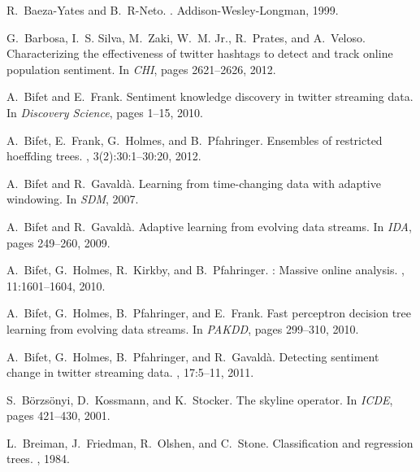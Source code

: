 \documentclass[twoside,leqno,twocolumn]{article}
\begin{document}






\begin{thebibliography}{10}
R.~Baeza-Yates and B.~R-Neto.
.
\newblock Addison-Wesley-Longman, 1999.

G.~Barbosa, I.~S. Silva, M.~Zaki, W.~M. {Jr.}, R.~Prates, and A.~Veloso.
\newblock Characterizing the effectiveness of twitter hashtags to detect and
  track online population sentiment.
\newblock In {\em CHI}, pages 2621--2626, 2012.

A.~Bifet and E.~Frank.
\newblock Sentiment knowledge discovery in twitter streaming data.
\newblock In {\em Discovery Science}, pages 1--15, 2010.

A.~Bifet, E.~Frank, G.~Holmes, and B.~Pfahringer.
\newblock Ensembles of restricted hoeffding trees.
, 3(2):30:1--30:20, 2012.

A.~Bifet and R.~Gavald{\`a}.
\newblock Learning from time-changing data with adaptive windowing.
\newblock In {\em SDM}, 2007.

A.~Bifet and R.~Gavald\`{a}.
\newblock Adaptive learning from evolving data streams.
\newblock In {\em IDA}, pages 249--260, 2009.

A.~Bifet, G.~Holmes, R.~Kirkby, and B.~Pfahringer.
: Massive online analysis.
, 11:1601--1604, 2010.

A.~Bifet, G.~Holmes, B.~Pfahringer, and E.~Frank.
\newblock Fast perceptron decision tree learning from evolving data streams.
\newblock In {\em PAKDD}, pages 299--310, 2010.

A.~Bifet, G.~Holmes, B.~Pfahringer, and R.~Gavald{\`a}.
\newblock Detecting sentiment change in twitter streaming data.
,
  17:5--11, 2011.

S.~B{\"o}rzs{\"o}nyi, D.~Kossmann, and K.~Stocker.
\newblock The skyline operator.
\newblock In {\em ICDE}, pages 421--430, 2001.

L.~Breiman, J.~Friedman, R.~Olshen, and C.~Stone.
\newblock Classification and regression trees.
, 1984.


\end{thebibliography}
\end{document}
